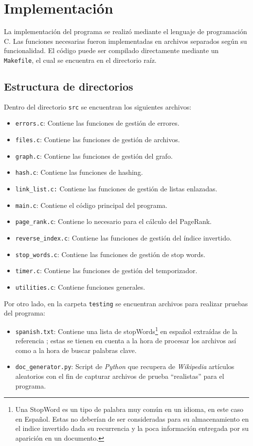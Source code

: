 \section{Implementación}
La implementación del programa se realizó mediante el lenguaje de programación C. Las funciones necesarias fueron implementadas en archivos separados según su funcionalidad. El código puede ser compilado directamente mediante un \texttt{Makefile}, el cual se encuentra en el directorio raíz.

\subsection{Estructura de directorios}
Dentro del directorio \texttt{src} se encuentran los siguientes archivos:

\begin{itemize}
    \item \texttt{errors.c}: Contiene las funciones de gestión de errores.
    \item \texttt{files.c}: Contiene las funciones de gestión de archivos.
    \item \texttt{graph.c}: Contiene las funciones de gestión del grafo.
    \item \texttt{hash.c}: Contiene las funciones de hashing.
    \item \texttt{link\_list.c:} Contiene las funciones de gestión de listas enlazadas.
    \item \texttt{main.c}: Contiene el código principal del programa.
    \item \texttt{page\_rank.c}: Contiene lo necesario para el cálculo del PageRank.
    \item \texttt{reverse\_index.c}: Contiene las funciones de gestión del índice invertido.
    \item \texttt{stop\_words.c}: Contiene las funciones de gestión de stop words.
    \item \texttt{timer.c}: Contiene las funciones de gestión del temporizador.
    \item \texttt{utilities.c}: Contiene funciones generales.
\end{itemize}

Por otro lado, en la carpeta \texttt{testing} se encuentran archivos para realizar pruebas del programa:
\begin{itemize}
    \item \texttt{spanish.txt}: Contiene una lista de stopWords\footnote{Una StopWord es un tipo de palabra muy común en un idioma, en este caso en Español. Estas no deberían de ser consideradas para su almacenamiento en el indice invertido dada su recurrencia y la poca información entregada por su aparición en un documento.} en español extraídas de la referencia \cite{SpanishStopWords}; estas se tienen en cuenta a la hora de procesar los archivos así como a la hora de buscar palabras clave.
    \item \texttt{doc\_generator.py}: Script de \textit{Python} que recupera de \textit{Wikipedia} artículos aleatorios con el fin de capturar archivos de prueba ``realistas'' para el programa.
\end{itemize}

